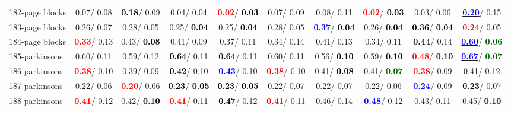 \begin{table}[h]
\begin{center}
{\begin{tabular}{lc|c|c|c|c|c|c|c|c}
182-page blocks &   0.07/  0.08 & \textcolor{black}{\textbf{  0.18}}/  0.09 &   0.04/  0.04 & \textcolor{red}{\textbf{  0.02}}/\textcolor{black}{\textbf{  0.03}} &   0.07/  0.09 &   0.08/  0.11 & \textcolor{red}{\textbf{  0.02}}/\textcolor{black}{\textbf{  0.03}} &   0.03/  0.06 & \underline{\textcolor{blue}{\textbf{  0.20}}}/  0.15 \\
183-page blocks &   0.26/  0.07 &   0.28/  0.05 &   0.25/\textcolor{black}{\textbf{  0.04}} &   0.25/\textcolor{black}{\textbf{  0.04}} &   0.28/  0.05 & \underline{\textcolor{blue}{\textbf{  0.37}}}/\textcolor{black}{\textbf{  0.04}} &   0.26/\textcolor{black}{\textbf{  0.04}} & \textcolor{black}{\textbf{  0.36}}/\textcolor{black}{\textbf{  0.04}} & \textcolor{red}{\textbf{  0.24}}/  0.05 \\
184-page blocks & \textcolor{red}{\textbf{  0.33}}/  0.13 &   0.43/\textcolor{black}{\textbf{  0.08}} &   0.41/  0.09 &   0.37/  0.11 &   0.34/  0.14 &   0.41/  0.13 &   0.34/  0.11 & \textcolor{black}{\textbf{  0.44}}/  0.14 & \underline{\textcolor{blue}{\textbf{  0.60}}}/\textcolor{darkgreen}{\textbf{  0.06}} \\
185-parkinsons &   0.60/  0.11 &   0.59/  0.12 & \textcolor{black}{\textbf{  0.64}}/  0.11 & \textcolor{black}{\textbf{  0.64}}/  0.11 &   0.60/  0.11 &   0.56/\textcolor{black}{\textbf{  0.10}} &   0.59/\textcolor{black}{\textbf{  0.10}} & \textcolor{red}{\textbf{  0.48}}/\textcolor{black}{\textbf{  0.10}} & \underline{\textcolor{blue}{\textbf{  0.67}}}/\textcolor{darkgreen}{\textbf{  0.07}} \\
186-parkinsons & \textcolor{red}{\textbf{  0.38}}/  0.10 &   0.39/  0.09 & \textcolor{black}{\textbf{  0.42}}/  0.10 & \underline{\textcolor{blue}{\textbf{  0.43}}}/  0.10 & \textcolor{red}{\textbf{  0.38}}/  0.10 &   0.41/\textcolor{black}{\textbf{  0.08}} &   0.41/\textcolor{darkgreen}{\textbf{  0.07}} & \textcolor{red}{\textbf{  0.38}}/  0.09 &   0.41/  0.12 \\
187-parkinsons &   0.22/  0.06 & \textcolor{red}{\textbf{  0.20}}/  0.06 & \textcolor{black}{\textbf{  0.23}}/\textcolor{black}{\textbf{  0.05}} & \textcolor{black}{\textbf{  0.23}}/\textcolor{black}{\textbf{  0.05}} &   0.22/  0.07 &   0.22/  0.07 &   0.22/  0.06 & \underline{\textcolor{blue}{\textbf{  0.24}}}/  0.09 & \textcolor{black}{\textbf{  0.23}}/  0.07 \\
188-parkinsons & \textcolor{red}{\textbf{  0.41}}/  0.12 &   0.42/\textcolor{black}{\textbf{  0.10}} & \textcolor{red}{\textbf{  0.41}}/  0.11 & \textcolor{black}{\textbf{  0.47}}/  0.12 & \textcolor{red}{\textbf{  0.41}}/  0.11 &   0.46/  0.14 & \underline{\textcolor{blue}{\textbf{  0.48}}}/  0.12 &   0.43/  0.11 &   0.45/\textcolor{black}{\textbf{  0.10}} \\ \hline

\end{tabular}}
\end{center}
\end{table}
